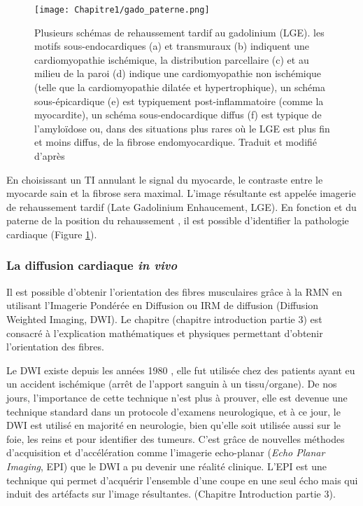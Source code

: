 \begin{figure}[!htbp]
  \begin{center}
    \texttt{[image: Chapitre1/gado\_paterne.png]}
     \end{center}
    \caption{Plusieurs schémas de rehaussement tardif au gadolinium (LGE). les motifs sous-endocardiques (a) et transmuraux (b) indiquent une cardiomyopathie ischémique, la distribution parcellaire (c) et au milieu de la paroi (d) indique une cardiomyopathie non ischémique (telle que la cardiomyopathie dilatée et hypertrophique), un schéma sous-épicardique (e) est typiquement post-inflammatoire (comme la myocardite), un schéma sous-endocardique diffus (f) est typique de l'amyloïdose ou, dans des situations plus rares où le LGE est plus fin et moins diffus, de la fibrose endomyocardique. Traduit et modifié d'après \cite{Barison2022-ok}}
  \label{fig:gado_paterne}
\end{figure}

En choisissant un TI annulant le signal du myocarde, le contraste entre le myocarde sain et la fibrose sera maximal. L’image résultante est appelée imagerie de rehaussement tardif (Late Gadolinium Enhaucement, LGE). En fonction et du paterne de la position du rehaussement  \cite{Barison2022-ok}, il est possible d’identifier la pathologie cardiaque (Figure \ref{fig:gado_paterne}).
\clearpage
\subsubsection{La diffusion cardiaque \textit{in vivo} }
Il est possible d’obtenir l’orientation des fibres musculaires grâce à la RMN en utilisant l’Imagerie Pondérée en Diffusion ou IRM de diffusion (Diffusion Weighted Imaging, DWI). Le chapitre (chapitre introduction partie 3) est consacré à l’explication mathématiques et physiques permettant d’obtenir l’orientation des fibres.

Le DWI existe depuis les années 1980 \cite{LeBihan1986}, elle fut utilisée chez des patients ayant eu un accident ischémique (arrêt de l’apport sanguin à un tissu/organe).  De nos jours, l’importance de cette technique n’est plus à prouver, elle est devenue une technique standard dans un protocole d’examens neurologique, et à ce jour, le DWI est utilisé en majorité en neurologie, bien qu’elle soit utilisée aussi sur le foie, les reins et pour identifier des tumeurs. C’est grâce de nouvelles méthodes d’acquisition et d’accélération comme l’imagerie echo-planar (\textit{Echo Planar Imaging}, EPI) \cite{Mansfield1977} \cite{PoustchiAmin2001} que le DWI a pu devenir une réalité clinique. L’EPI est une technique qui permet d’acquérir l’ensemble d’une coupe en une seul écho mais qui induit des artéfacts sur l’image résultantes. (Chapitre Introduction partie 3).

